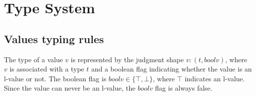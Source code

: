 \section{Type System}











\newcommand{\valuetype}[2]{\mathit{#1} : ( #2 , \mathit{boolv} )}
\newcommand{\boolv}{\mathit{boolv}}
\newcommand{\true}{\top}
\newcommand{\false}{\bot}
\newcommand{\bitvector}[1]{\mathbf{bs}^{ #1 }}
\newcommand{\botval}{\mathbf{bot}}
\newcommand{\literal}[1]{\left[ #1_{\mathrm{1}} , .. \, , #1_{\mathrm{n}} \right]}
\newcommand{\err}{\mathbf{err}}


\newcommand{\vstruct}[1]{\ottkw{struct} \{\, #1 \,\}}
\newcommand{\structtyp}[1]{\ottkw{struct} [\, #1 \,]}

\newcommand{\code}[1]{\texttt{#1}}
\newcommand{\var}[1]{\mathrm{#1}}

\newcommand{\structxv}[2]{#1_{\var{1}} = #2_{\mathrm{1}};\, .. \, ;\, #1_{\var{n}} = #2_{\mathrm{n}}}
\newcommand{\structxtau}[2]{#1_{\var{1}}\, #2_{1}, .. \, , #1_{\var{n}}\, #2_{n}}

\newcommand{\ejudjtyp}[5]{ $ #1 \, #2 \; \vdash #3 : ( #4 , #5 )$}

\newcommand{\Td}{T_{\Delta}}


\newcommand{\typingscopest}{$\Psi_t$}
\newcommand{\typingscopestup}[2]{()}





\subsection{Values typing rules}
The type of a value $v$ is represented by the judgment shape $\valuetype{v}{t}$, where $v$ is associated with a type $t$ and a boolean flag indicating whether the value is an l-value or not. The boolean flag is $\boolv \in \{ \true, \false \}$, where $\true$ indicates an l-value. Since the value can never be an l-value, the $\boolv$ flag is always false.

